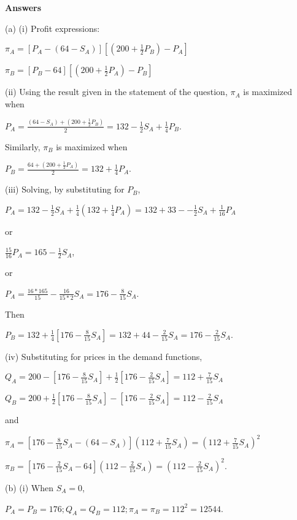 \begin{enumerate}
	\textbf{Answers}
	
	\bigskip

	(a) (i) Profit expressions:

	$\pi _{A}=[P_{A}-(64-S_{A})][(200+\frac{1}{2}P_{B})-P_{A}]$

	$\pi _{B}=[P_{B}-64][(200+\frac{1}{2}P_{A})-P_{B}]$

	\bigskip

	(ii) Using the result given in the statement of the question, $\pi _{A}$ is
	maximized when

	$P_{A}=\frac{(64-S_{A})+(200+\frac{1}{2}P_{B})}{2}=132-\frac{1}{2}S_{A}+%
	\frac{1}{4}P_{B}.$

	Similarly, $\pi _{B}$ is maximized when

	$P_{B}=\frac{64+(200+\frac{1}{2}P_{A})}{2}=132+\frac{1}{4}P_{A}.$

	\bigskip

	(iii) Solving, by substituting for $P_{B}$,

	$P_{A}=132-\frac{1}{2}S_{A}+\frac{1}{4}(132+\frac{1}{4}P_{A})=132+33--\frac{1%
	}{2}S_{A}+\frac{1}{16}P_{A}$

	or

	$\frac{15}{16}P_{A}=165-\frac{1}{2}S_{A}$,

	or

	$P_{A}=\frac{16\ast 165}{15}-\frac{16}{15\ast 2}S_{A}=176-\frac{8}{15}S_{A}$.

	Then

	$P_{B}=132+\frac{1}{4}[176-\frac{8}{15}S_{A}]=132+44-\frac{2}{15}S_{A}=176-%
	\frac{2}{15}S_{A}.$

	\bigskip

	(iv) Substituting for prices in the demand functions,

	$Q_{A}=200-[176-\frac{8}{15}S_{A}]+\frac{1}{2}[176-\frac{2}{15}S_{A}]=112+%
	\frac{7}{15}S_{A}$

	$Q_{B}=200+\frac{1}{2}[176-\frac{8}{15}S_{A}]-[176-\frac{2}{15}S_{A}]=112-%
	\frac{2}{15}S_{A}$

	and

	$\pi _{A}=[176-\frac{8}{15}S_{A}-(64-S_{A})](112+\frac{7}{15}S_{A})=(112+%
	\frac{7}{15}S_{A})^{2}$

	$\pi _{B}=[176-\frac{2}{15}S_{A}-64](112-\frac{2}{15}S_{A})=(112-\frac{2}{15}%
	S_{A})^{2}.$

	\bigskip

	(b) (i) When $S_{A}=0$,

	$P_{A}=P_{B}=176;Q_{A}=Q_{B}=112;\pi _{A}=\pi _{B}=112^{2}=12544$.


\end{enumerate}
